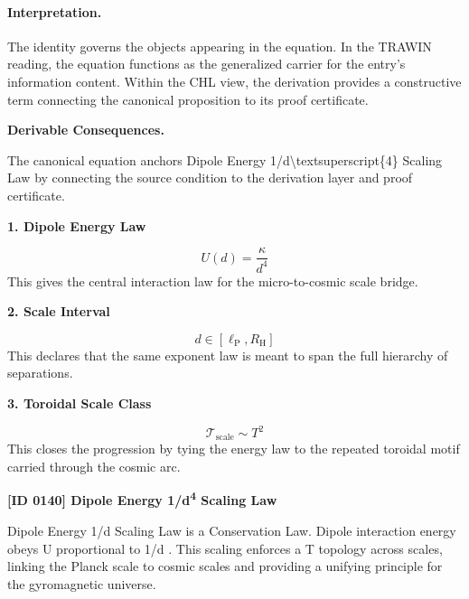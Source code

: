 \paragraph{Interpretation.}
The identity governs the objects appearing in the equation. In the TRAWIN reading, the equation functions as the generalized carrier for the entry’s information content. Within the CHL view, the derivation provides a constructive term connecting the canonical proposition to its proof certificate.

\par\vspace{0.35em}
\noindent\textbf{Derivable Consequences.}\quad
\begingroup
\footnotesize
\raggedright
The canonical equation anchors Dipole Energy 1/d\textbackslash{}textsuperscript\{4\} Scaling Law by connecting the source condition to the derivation layer and proof certificate.
\par\endgroup

\noindent\textbf{1. Dipole Energy Law}\par
\[
U(d)=\frac{\kappa}{d^4}
\]
\noindent This gives the central interaction law for the micro-to-cosmic scale bridge.\par
\noindent\textbf{2. Scale Interval}\par
\[
d\in [\ell_{\mathrm{P}},R_{\mathrm{H}}]
\]
\noindent This declares that the same exponent law is meant to span the full hierarchy of separations.\par
\noindent\textbf{3. Toroidal Scale Class}\par
\[
\mathcal{T}_{\mathrm{scale}}\sim T^2
\]
\noindent This closes the progression by tying the energy law to the repeated toroidal motif carried through the cosmic arc.\par

\clearpage
\noindent\textbf{[ID 0140] Dipole Energy 1/d\textsuperscript{4} Scaling Law}\par
\vspace{0.35em}
\begingroup\small
{}
Dipole Energy 1/d  Scaling Law is a Conservation Law. Dipole interaction energy obeys U proportional to 1/d . This scaling enforces a T  topology across scales, linking the Planck scale to cosmic scales and providing a unifying principle for the gyromagnetic universe.

